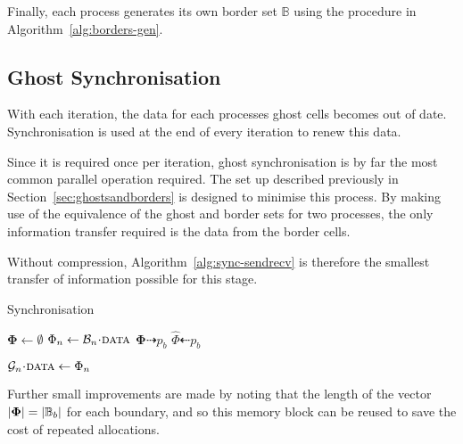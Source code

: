 \documentclass[twoside]{IIBproject}
\newcommand{\vect} [1] {\bm{#1}}
\newcommand{\dra}{\dashrightarrow}
\newcommand{\dla}{\dashleftarrow}
\newcommand{\acc}{{\mkern 0.5mu\cdot\mkern 0.5mu}}
\numberwithin{figure}{section}
\begin{document}
        Finally, each process generates its own border set $\mathbb{B}$ using the procedure in Algorithm~\ref{alg:borders-gen}.



    \subsection{Ghost Synchronisation} %
        \label{sec:ghostsync}

        With each iteration, the data for each processes ghost cells becomes out of date. Synchronisation is used at the end of every iteration to renew this data.

        Since it is required once per iteration, ghost synchronisation is by far the most common parallel operation required. The set up described previously in Section~\ref{sec:ghostsandborders} is designed to minimise this process. By making use of the equivalence of the ghost and border sets for two processes, the only information transfer required is the data from the border cells.

        Without compression, Algorithm~\ref{alg:sync-sendrecv} is therefore the smallest transfer of information possible for this stage.

        \begin{algorithm}[H]
            \caption{Synchronisation}
            \label{alg:sync-sendrecv}

            \begin{algorithmic}
                    \State $\vect{\Phi} \gets \emptyset$
                        \State $\Phi_n \gets \mathcal{B}_n\acc\textproc{data}$
                    \EndFor
                    \Send $\vect{\Phi} \dra p_b$
                \EndFor
                \Statex
                    \Recv $\hat \Phi \dla p_b$

                        \State $\mathcal{G}_n\acc\textproc{data} \gets \Phi_n$
                    \EndFor
                \EndFor
            \end{algorithmic}
        \end{algorithm}

        Further small improvements are made by noting that the length of the vector $\abs{\vect{\Phi}} = \abs{\mathbb{B}_b}$ for each boundary, and so this memory block can be reused to save the cost of repeated allocations.
\end{document}
